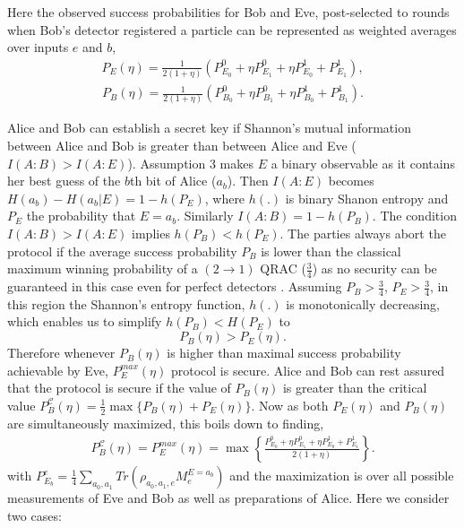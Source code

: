 \documentclass[smallextended]{svjour3}
\newcommand{\be}{\begin{eqnarray}}
\newcommand{\ee}{\end{eqnarray}}
\begin{document}
Here the observed success probabilities for Bob and Eve, post-selected to rounds when Bob's detector registered a particle can be represented as weighted averages over inputs $e$ and $b$,
\be
P_E(\eta)=\frac{1}{2(1+\eta)}\left(P_{E_0}^0+\eta P_{E_1}^0+\eta P_{E_0}^1+P_{E_1}^1\right),\label{PE}
\ee
\be
P_B(\eta)=\frac{1}{2(1+\eta)}\left(P_{B_0}^{0}+\eta P_{B_1}^{0}+\eta P_{B_0}^{1}+P_{B_1}^{1}\right).\label{PB}
\ee





Alice and Bob can establish a secret key if Shannon's mutual information between Alice and Bob is greater than between Alice and Eve ($I(A:B) > I(A:E)$). Assumption 3 makes $E$ a binary observable as it contains her best guess of the $b$th bit of Alice ($a_b$). Then $I(A:E)$ becomes $H(a_b)-H(a_b|E)=1-h(P_E)$, where $h(.)$ is binary Shanon entropy and $P_E$ the probability that $E=a_b$. Similarly $I(A:B)=1-h(P_B)$. The condition $I(A:B) > I(A:E)$ implies $h(P_B)<h(P_E)$. The parties always abort the protocol if the average success probability $P_B$ is lower than the classical maximum winning probability of a $(2\to 1)$ QRAC ($\frac{3}{4}$) as no security can be guaranteed in this case even for perfect detectors \cite{pawlowski2011semi}. Assuming $P_B>\frac{3}{4}$, $P_E>\frac{3}{4}$, in this region the Shannon's entropy function, $h(.)$ is monotonically decreasing, which enables us to simplify $h(P_B)<H(P_E)$ to
\begin{equation}
P_B(\eta)>P_E(\eta). \label{marker}
\end{equation}
Therefore whenever $P_B(\eta)$ is higher than maximal success probability achievable by Eve, $P_E^{max}(\eta)$  protocol is secure. Alice and Bob can rest assured that the protocol is secure if the value of $P_B(\eta)$ is greater than the critical value $P_B^{\mathcal{C}}(\eta)=\frac{1}{2}\max\{P_B(\eta)+P_E(\eta)\}$. Now as both $P_E(\eta)$ and $P_B(\eta)$ are simultaneously maximized, this boils down to finding,  
\be
P_B^{\mathcal{C}}(\eta)=P_E^{max}(\eta)=\max\left\{\frac{P_{E_0}^0+\eta P_{E_1}^0+\eta P_{E_0}^1+P_{E_1}^1}{2(1+\eta)}\right\}.\label{max2}
\ee
with  $P_{E_b}^e=\frac{1}{4}\sum_{a_0,a_1}Tr (\rho_{a_0,a_1,e}M^{E=a_b}_e)$ and the maximization is over all possible measurements of Eve and Bob as well as preparations of Alice. Here we consider two cases:
\end{document}
